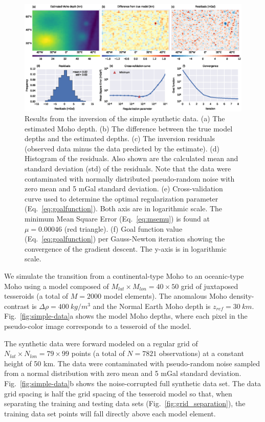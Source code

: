 \documentclass[extra,mreferee]{gji}
\begin{document}
\begin{figure}
    \centering
    \includegraphics[width=\textwidth]{figures/synthetic-simple-results}
    \caption{
        Results from the inversion of the simple synthetic data.
        (a) The estimated Moho depth.
        (b) The difference between the true model depths
        and the estimated depths.
        (c) The inversion residuals (observed data minus
        the data predicted by the estimate).
        (d) Histogram of the residuals. Also shown are the calculated
        mean and standard deviation (std) of the residuals.
        Note that the data were contaminated with normally distributed
        pseudo-random noise with zero mean and 5 mGal standard deviation.
        (e) Cross-validation curve used to determine the optimal regularization
        parameter (Eq.~\ref{eq:goalfunction}).
        Both axis are in logarithmic scale.
        The minimum Mean Square Error (Eq.~\ref{eq:msemu}) is found at
        $\mu = 0.00046$ (red triangle).
        (f) Goal function value (Eq.~\ref{eq:goalfunction}) per Gauss-Newton
        iteration showing the convergence of the gradient descent.
        The y-axis is in logarithmic scale.
    }
    \label{fig:simple-results}
\end{figure}

We simulate the transition from a continental-type Moho to an oceanic-type Moho
using a model composed of $M_{lat} \times M_{lon} = 40 \times 50$ grid of
juxtaposed tesseroids (a total of $M = 2000$ model elements).
The anomalous Moho density-contrast is $\Delta\rho = 400\ kg/m^3$
and the Normal Earth Moho depth is $z_{ref} = 30\ km$.
Fig.~\ref{fig:simple-data}a shows the model Moho depths,
where each pixel in the pseudo-color image corresponds to
a tesseroid of the model.

The synthetic data were forward modeled on a regular grid of
$N_{lat} \times N_{lon} = 79 \times 99$ points
(a total of $N = 7821$ observations)
at a constant height of 50 km.
The data were contaminated with pseudo-random noise
sampled from a normal distribution with zero mean and 5 mGal standard deviation.
Fig.~\ref{fig:simple-data}b shows the noise-corrupted full synthetic data set.
The data grid spacing is half the grid spacing of the tesseroid model
so that, when separating the training and testing data sets
(Fig.~\ref{fig:grid_separation}),
the training data set points will fall directly above each model element.
\end{document}
